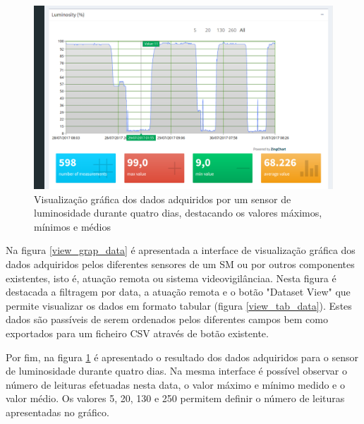 \begin{figure}[h]
	\centering
	\includegraphics[width=0.9\linewidth]{prints-web/humidity.png}
	\caption{Visualização gráfica dos dados adquiridos por um sensor de luminosidade durante quatro dias, destacando os valores máximos, mínimos e médios}
	\label{grafico_humidade}
\end{figure}



Na figura \ref{view_grap_data} é apresentada a interface de visualização gráfica dos dados adquiridos pelos diferentes sensores de um \acl{SM} ou por outros componentes existentes, isto é, atuação remota ou sistema videovigilânciaa. Nesta figura é destacada a filtragem por data, a atuação remota e o botão "Dataset View" que permite visualizar os dados em formato tabular (figura \ref{view_tab_data}). Estes dados são passíveis de serem ordenados pelos diferentes campos bem como exportados para um ficheiro \ac{CSV} através de botão existente. 


Por fim, na figura \ref{grafico_humidade} é apresentado o resultado dos dados adquiridos para o sensor de luminosidade durante quatro dias. Na mesma interface é possível observar o número de leituras efetuadas nesta data, o valor máximo e mínimo medido e o valor médio. Os valores 5, 20, 130 e 250 permitem definir o número de leituras apresentadas no gráfico. 

 


